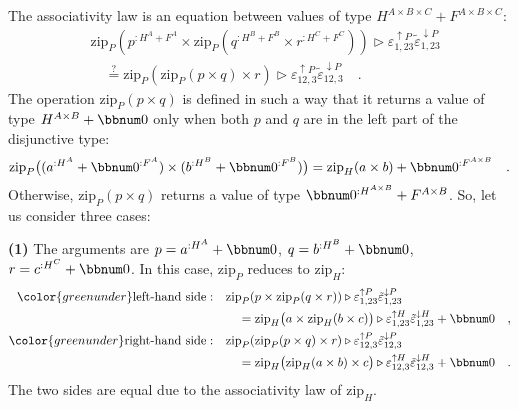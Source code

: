 The associativity law is an equation between values of type $H^{A\times B\times C}+F^{A\times B\times C}$:
\begin{align*}
 & \text{zip}_{P}(p^{:H^{A}+F^{A}}\times\text{zip}_{P}(q^{:H^{B}+F^{B}}\times r^{:H^{C}+F^{C}}))\triangleright\varepsilon_{1,23}^{\uparrow P}\tilde{\varepsilon}_{1,23}^{\downarrow P}\\
 & \quad\overset{?}{=}\text{zip}_{P}(\text{zip}_{P}(p\times q)\times r)\triangleright\varepsilon_{12,3}^{\uparrow P}\tilde{\varepsilon}_{12,3}^{\downarrow P}\quad.
\end{align*}
The operation $\text{zip}_{P}(p\times q)$ is defined in such a way
that it returns a value of type $H^{A\times B}+\bbnum 0$ only when
both $p$ and $q$ are in the left part of the disjunctive type:
\[
\text{zip}_{P}\big((a^{:H^{A}}+\bbnum 0^{:F^{A}})\times(b^{:H^{B}}+\bbnum 0^{:F^{B}})\big)=\text{zip}_{H}(a\times b)+\bbnum 0^{:F^{A\times B}}\quad.
\]
Otherwise, $\text{zip}_{P}(p\times q)$ returns a value of type $\bbnum 0^{:H^{A\times B}}+F^{A\times B}$.
So, let us consider three cases:

\textbf{(1)} The arguments are $p=a^{:H^{A}}+\bbnum 0$, $q=b^{:H^{B}}+\bbnum 0$,
$r=c^{:H^{C}}+\bbnum 0$. In this case, $\text{zip}_{P}$ reduces
to $\text{zip}_{H}$:
\begin{align*}
{\color{greenunder}\text{left-hand side}:}\quad & \text{zip}_{P}(p\times\text{zip}_{P}(q\times r))\triangleright\varepsilon_{1,23}^{\uparrow P}\tilde{\varepsilon}_{1,23}^{\downarrow P}\\
 & \quad=\text{zip}_{H}\big(a\times\text{zip}_{H}(b\times c)\big)\triangleright\varepsilon_{1,23}^{\uparrow H}\tilde{\varepsilon}_{1,23}^{\downarrow H}+\bbnum 0\quad,\\
{\color{greenunder}\text{right-hand side}:}\quad & \text{zip}_{P}(\text{zip}_{P}(p\times q)\times r)\triangleright\varepsilon_{12,3}^{\uparrow P}\tilde{\varepsilon}_{12,3}^{\downarrow P}\\
 & \quad=\text{zip}_{H}\big(\text{zip}_{H}(a\times b)\times c\big)\triangleright\varepsilon_{12,3}^{\uparrow H}\tilde{\varepsilon}_{12,3}^{\downarrow H}+\bbnum 0\quad.
\end{align*}
The two sides are equal due to the associativity law of $\text{zip}_{H}$.

